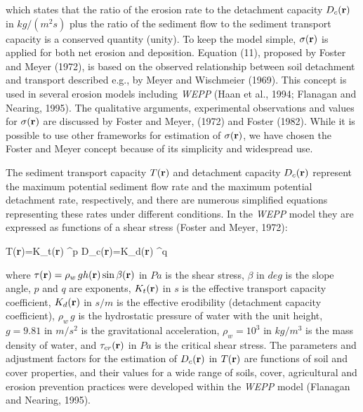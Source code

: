 \documentclass{kapedbk} %
\begin{document}
\noindent
 which states that the ratio of the erosion rate to the detachment
 capacity $D_c ({\bf r})$ in $kg/(m^2s)$ %
 plus the ratio of the sediment flow to the sediment transport capacity is
 a conserved quantity (unity). To keep the model simple, $\sigma({\bf r})$
is applied for both net erosion and deposition.
Equation (11), proposed by Foster and Meyer (1972),
is based on the observed relationship between soil detachment and transport
described e.g., by Meyer and Wischmeier
(1969). This concept is used in several erosion models including {\sl WEPP}
(Haan et al., 1994; Flanagan and Nearing, 1995).
The qualitative arguments, experimental observations and values for
 $\sigma({\bf r})$   are discussed by Foster and Meyer, (1972)
and Foster (1982). While it is possible to use other frameworks
for estimation of  $\sigma({\bf r})$, we have chosen the Foster and
Meyer concept because of its simplicity and widespread use.

The sediment transport capacity $T({\bf r})$ and detachment capacity
$D_c({\bf r})$ represent the maximum potential
sediment flow rate and the maximum potential detachment rate, respectively,
and there are numerous simplified equations representing these rates under
different conditions. In the {\sl WEPP} model they are expressed as functions
of a shear stress (Foster and Meyer, 1972):

\leftequation
T({\bf r})=K_t({\bf r}) ^p
\endleftequation
\leftequation
D_c({\bf r})=K_d({\bf r}) ^q
\endleftequation

\smallskip
\noindent
where $\tau({\bf r})=\rho_w\, g h({\bf r}) \sin \beta({\bf r})$ in
$Pa$ is the shear stress,
$ \beta$ in $deg$ is the slope angle,
$p$ and $q$ are exponents,
$ K_t({\bf r})$ in $s$ is the effective transport capacity coefficient,
$K_d({\bf r})$ in $s/m$ is the effective erodibility
(detachment capacity coefficient),
$\rho_w\, g$  is the hydrostatic pressure
of water with the unit height,
$ g=9.81$ in $m/s^2$ is the gravitational acceleration,
$\rho_w=10^3$ in $kg/m^3$ is the  mass density of water,
and
$\tau_{cr}({\bf r})$ in $Pa$ is the critical shear stress.
The parameters and adjustment factors for the estimation of
$D_c ({\bf r})$ in $T({\bf r})$
are functions of soil and cover properties, and their values
for a wide range of soils, cover, agricultural and 
erosion prevention practices
were developed within the {\sl WEPP} model (Flanagan and Nearing, 1995).
\end{document}
